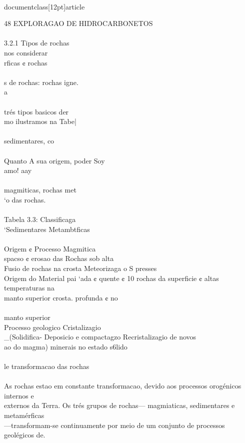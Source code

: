 \\documentclass[12pt]{article}
\begin{document}
48 EXPLORAGAO DE HIDROCARBONETOS\\
\\
3.2.1 Tipos de rochas\\
nos considerar\\
rficas ¢ rochas\\
\\
s de rochas: rochas igne.\\
a\\
\\
trés tipos basicos der\\
mo ilustramos na Tabe|\\
\\
sedimentares, co\\
\\
Quanto A sua origem, poder Soy\\
amo! aay\\
\\
magmiticas, rochas met\\
‘o das rochas.\\
\\
Tabela 3.3: Classificaga\\
‘Sedimentares Metambtficas\\
\\
Origem ¢ Processo Magmitica\\
spacso ¢ erosao das Rochas sob alta\\
Fusio de rochas na crosta Meteorizaga o S presses\\
Origem do Material pai ‘ada ¢ quente ¢ 10 rochas da superficie ¢ altas temperaturas na\\
manto superior crosta. profunda ¢ no\\
\\
manto superior\\
Processo geologico Cristalizagio \\_(Solidifica- Deposicio e compactagzo Recristalizagio de novos\\
ao do magma) minerais no estado s6lido\\
\\
le transformacao das rochas\\
\\
As rochas estao em constante transformacao, devido aos processos orogénicos internos e\\
externos da Terra. Os trés grupos de rochas— magmiaticas, sedimentares e metamérficas\\
—transformam-se continuamente por meio de um conjunto de processos geolégicos de.\\
\end{document}
